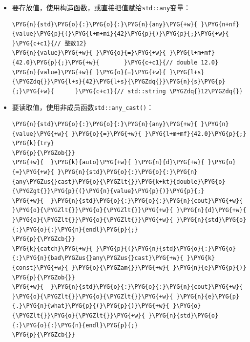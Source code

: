 \begin{itemize}
\item 要存放值，使用构造函数，或直接把值赋给\texttt{std::\allowbreak{}any}变量：



\begin{codeblockbg}
\begin{Verbatim}[commandchars=\\\{\},breaklines=true,breakanywhere=true,fontsize=\codefont,xleftmargin=17bp]
\PYG{n}{std}\PYG{o}{:}\PYG{o}{:}\PYG{n}{any}\PYG{+w}{ }\PYG{n+nf}{value}\PYG{p}{(}\PYG{l+m+mi}{42}\PYG{p}{)}\PYG{p}{;}\PYG{+w}{ }\PYG{c+c1}{// 整数12}
\PYG{n}{value}\PYG{+w}{ }\PYG{o}{=}\PYG{+w}{ }\PYG{l+m+mf}{42.0}\PYG{p}{;}\PYG{+w}{       }\PYG{c+c1}{// double 12.0}
\PYG{n}{value}\PYG{+w}{ }\PYG{o}{=}\PYG{+w}{ }\PYG{l+s}{\PYGZdq{}}\PYG{l+s}{42}\PYG{l+s}{\PYGZdq{}}\PYG{n}{s}\PYG{p}{;}\PYG{+w}{      }\PYG{c+c1}{// std::string \PYGZdq{}12\PYGZdq{}}
\end{Verbatim}
\end{codeblockbg}



\item 要读取值，使用非成员函数\texttt{std::\allowbreak{}any\_\allowbreak{}cast()}：



\begin{codeblockbg}
\begin{Verbatim}[commandchars=\\\{\},breaklines=true,breakanywhere=true,fontsize=\codefont,xleftmargin=17bp]
\PYG{n}{std}\PYG{o}{:}\PYG{o}{:}\PYG{n}{any}\PYG{+w}{ }\PYG{n}{value}\PYG{+w}{ }\PYG{o}{=}\PYG{+w}{ }\PYG{l+m+mf}{42.0}\PYG{p}{;}
\PYG{k}{try}
\PYG{p}{\PYGZob{}}
\PYG{+w}{  }\PYG{k}{auto}\PYG{+w}{ }\PYG{n}{d}\PYG{+w}{ }\PYG{o}{=}\PYG{+w}{ }\PYG{n}{std}\PYG{o}{:}\PYG{o}{:}\PYG{n}{any\PYGZus{}cast}\PYG{o}{\PYGZlt{}}\PYG{k+kt}{double}\PYG{o}{\PYGZgt{}}\PYG{p}{(}\PYG{n}{value}\PYG{p}{)}\PYG{p}{;}
\PYG{+w}{  }\PYG{n}{std}\PYG{o}{:}\PYG{o}{:}\PYG{n}{cout}\PYG{+w}{ }\PYG{o}{\PYGZlt{}}\PYG{o}{\PYGZlt{}}\PYG{+w}{ }\PYG{n}{d}\PYG{+w}{ }\PYG{o}{\PYGZlt{}}\PYG{o}{\PYGZlt{}}\PYG{+w}{ }\PYG{n}{std}\PYG{o}{:}\PYG{o}{:}\PYG{n}{endl}\PYG{p}{;}
\PYG{p}{\PYGZcb{}}
\PYG{k}{catch}\PYG{+w}{ }\PYG{p}{(}\PYG{n}{std}\PYG{o}{:}\PYG{o}{:}\PYG{n}{bad\PYGZus{}any\PYGZus{}cast}\PYG{+w}{ }\PYG{k}{const}\PYG{+w}{ }\PYG{o}{\PYGZam{}}\PYG{+w}{ }\PYG{n}{e}\PYG{p}{)}
\PYG{p}{\PYGZob{}}
\PYG{+w}{  }\PYG{n}{std}\PYG{o}{:}\PYG{o}{:}\PYG{n}{cout}\PYG{+w}{ }\PYG{o}{\PYGZlt{}}\PYG{o}{\PYGZlt{}}\PYG{+w}{ }\PYG{n}{e}\PYG{p}{.}\PYG{n}{what}\PYG{p}{(}\PYG{p}{)}\PYG{+w}{ }\PYG{o}{\PYGZlt{}}\PYG{o}{\PYGZlt{}}\PYG{+w}{ }\PYG{n}{std}\PYG{o}{:}\PYG{o}{:}\PYG{n}{endl}\PYG{p}{;}
\PYG{p}{\PYGZcb{}}
\end{Verbatim}
\end{codeblockbg}



\end{itemize}
